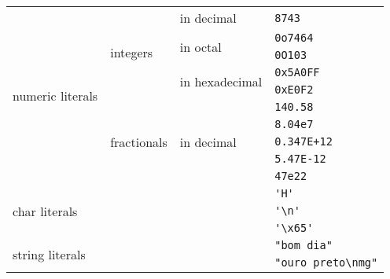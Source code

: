 \begin{table}[h!]
    \begin{tabularx}{\textwidth}{|l|l|l|l|}
    	\hline
      \multirow{10}{*}{numeric literals} & \multirow{5}{*}{integers} & in decimal & \verb|8743| \\ \cline{3-4}
      & & \multirow{2}{*}{in octal} & \verb|0o7464| \\ \cline{4-4}
      & & & \verb|0O103| \\ \cline{3-4}
      & & \multirow{2}{*}{in hexadecimal} & \verb|0x5A0FF| \\ \cline{4-4}
      & & & \verb|0xE0F2| \\ \cline{2-4}
      & \multirow{5}{*}{fractionals} & \multirow{5}{*}{in decimal} & \verb|140.58| \\ \cline{4-4}
      & & & \verb|8.04e7| \\ \cline{4-4}
      & & & \verb|0.347E+12| \\ \cline{4-4}
      & & & \verb|5.47E-12| \\ \cline{4-4}
      & & & \verb|47e22| \\ \cline{1-4}
      \multicolumn{3}{|l|}{\multirow{3}{*}{char literals}} & \verb|'H'| \\ \cline{4-4}
      \multicolumn{3}{|l|}{} & \verb|'\n'| \\ \cline{4-4}          %
      \multicolumn{3}{|l|}{} & \verb|'\x65'| \\ \cline{1-4}        %
      \multicolumn{3}{|l|}{\multirow{2}{*}{string literals}} & \verb|"bom dia"| \\ \cline{4-4}
      \multicolumn{3}{|l|}{} & \verb|"ouro preto\nmg"| \\ \cline{1-4}          %
    \end{tabularx}
\end{table}

